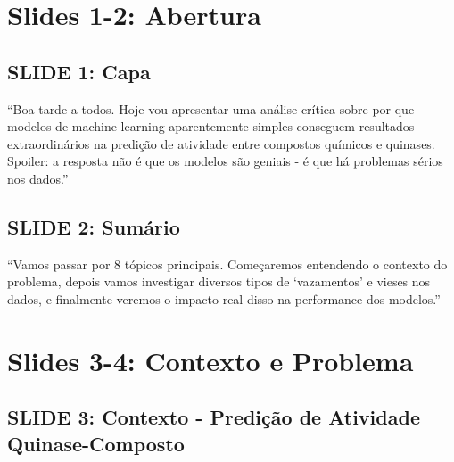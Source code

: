 \documentclass[11pt,a4paper]{article}
\begin{document}
\newpage

\section{Slides 1-2: Abertura}

\subsection{SLIDE 1: Capa}

\begin{oquedizer}
``Boa tarde a todos. Hoje vou apresentar uma análise crítica sobre por que modelos de machine learning aparentemente simples conseguem resultados extraordinários na predição de atividade entre compostos químicos e quinases. Spoiler: a resposta não é que os modelos são geniais - é que há problemas sérios nos dados.''
\end{oquedizer}

\subsection{SLIDE 2: Sumário}

\begin{oquedizer}
``Vamos passar por 8 tópicos principais. Começaremos entendendo o contexto do problema, depois vamos investigar diversos tipos de `vazamentos' e vieses nos dados, e finalmente veremos o impacto real disso na performance dos modelos.''
\end{oquedizer}

\section{Slides 3-4: Contexto e Problema}

\subsection{SLIDE 3: Contexto - Predição de Atividade Quinase-Composto}
\end{document}
